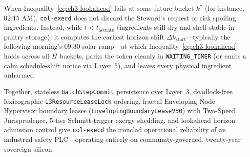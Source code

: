When Inequality~\eqref{eq:ch3-lookahead} fails at some future bucket $k^*$ (for instance,
02:15 AM), \texttt{col-execd} does not discard the Steward's request or risk spoiling
ingredients. Instead, while $t < t_{\mathrm{actuate}}$ (ingredients still dry and
shelf-stable in pantry storage), it computes the earliest horizon shift $\Delta k_{\mathrm{start}}$---typically
the following morning's 09:30 solar ramp---at which Inequality~\eqref{eq:ch3-lookahead}
holds across all $H$ buckets, parks the token cleanly in \texttt{WAITING\_TIMER} (or emits a
calm schedule-shift notice via Layer~5), and leaves every physical ingredient unharmed.

Together, stateless \texttt{BatchStepCommit} persistence over Layer~3, deadlock-free
lexicographic \texttt{L3ResourceLeaseLock} ordering, fractal Enveloping Node Hypervisor
boundary leases (\texttt{EnvelopingBoundaryLeaseV50}) with Two-Speed Jurisprudence, 5-tier
Schmitt-trigger exergy shedding, and lookahead horizon admission control give
\texttt{col-execd} the ironclad operational reliability of an industrial safety
PLC---operating entirely on community-governed, twenty-year sovereign silicon.
